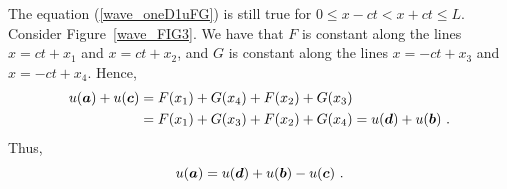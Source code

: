 
The equation (\ref{wave_oneD1uFG}) is still true for
$0 \leq x-ct < x+ct \leq L$.  Consider Figure~\ref{wave_FIG3}.
We have that $F$ is constant along
the lines $x=ct+x_1$ and $x=ct+x_2$, and $G$ is constant along the
lines $x=-ct+x_3$ and $x=-ct+x_4$.  Hence,
\begin{align*}
u({\bm{a}}) + u({\bm{c}}) &= F(x_1) + G(x_4) + F(x_2) + G(x_3) \\
&= F(x_1) + G(x_3) + F(x_2) + G(x_4) = u({\bm{d}}) + u({\bm{b}}) \ .
\end{align*}
Thus,
\begin{equation} \label{wave_geo1}
u({\bm{a}}) = u({\bm{d}}) + u({\bm{b}}) - u({\bm{c}})  \ .
\end{equation}

